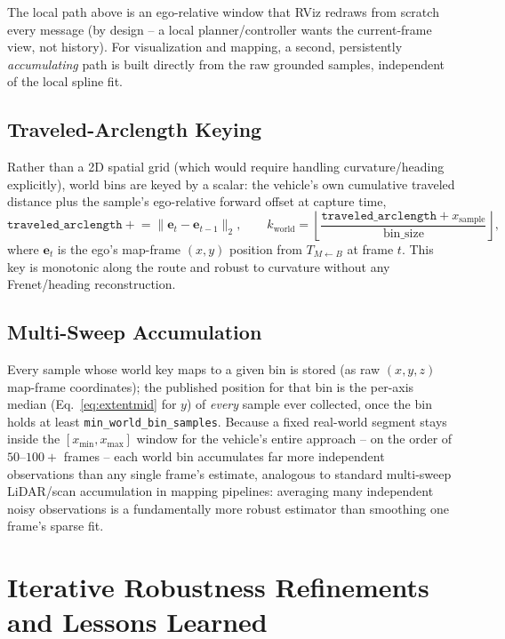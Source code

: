 \documentclass[11pt]{article}
\newcommand{\code}[1]{\texttt{#1}}
\begin{document}
The local path above is an ego-relative window that RViz redraws from scratch every message (by
design -- a local planner/controller wants the current-frame view, not history). For
visualization and mapping, a second, persistently \emph{accumulating} path is built directly from
the raw grounded samples, independent of the local spline fit.

\subsection{Traveled-Arclength Keying}
Rather than a 2D spatial grid (which would require handling curvature/heading explicitly), world
bins are keyed by a scalar: the vehicle's own cumulative traveled distance plus the sample's
ego-relative forward offset at capture time,
\begin{equation}
\texttt{traveled\_arclength} \mathrel{+}= \lVert \mathbf{e}_t - \mathbf{e}_{t-1} \rVert_2,
\qquad
k_{\text{world}} = \left\lfloor \frac{\texttt{traveled\_arclength} + x_{\text{sample}}}{\text{bin\_size}} \right\rfloor,
\end{equation}
where $\mathbf{e}_t$ is the ego's map-frame $(x,y)$ position from $T_{M \leftarrow B}$ at frame
$t$. This key is monotonic along the route and robust to curvature without any Frenet/heading
reconstruction.

\subsection{Multi-Sweep Accumulation}
Every sample whose world key maps to a given bin is stored (as raw $(x,y,z)$ map-frame
coordinates); the published position for that bin is the per-axis median (Eq.~\ref{eq:extentmid}
for $y$) of \emph{every} sample ever collected, once the bin holds at least
\code{min\_world\_bin\_samples}. Because a fixed real-world segment stays inside the
$[x_{\min},x_{\max}]$ window for the vehicle's entire approach -- on the order of $50$--$100+$
frames -- each world bin accumulates far more independent observations than any single frame's
estimate, analogous to standard multi-sweep LiDAR/scan accumulation in mapping pipelines: averaging
many independent noisy observations is a fundamentally more robust estimator than smoothing one
frame's sparse fit.

\section{Iterative Robustness Refinements and Lessons Learned}
\label{sec:refinements}
\end{document}
